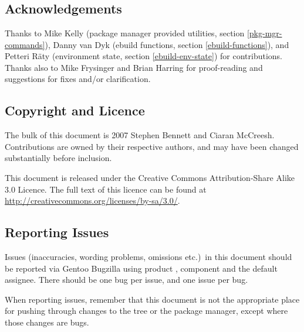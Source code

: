 \chapter*{}

\section*{Acknowledgements}

Thanks to Mike Kelly (package manager provided utilities, section \ref{pkg-mgr-commands}),
Danny van Dyk (ebuild functions, section \ref{ebuild-functions}), and
Petteri R\"aty (environment state, section \ref{ebuild-env-state}) for contributions. Thanks also to
Mike Frysinger and Brian Harring for proof-reading and suggestions for fixes and/or clarification.

\section*{Copyright and Licence}

The bulk of this document is \textcopyright{} 2007 Stephen Bennett and Ciaran McCreesh. Contributions
are owned by their respective authors, and may have been changed substantially before inclusion.

This document is released under the Creative Commons Attribution-Share Alike 3.0 Licence. The full
text of this licence can be found at \url{http://creativecommons.org/licenses/by-sa/3.0/}.

\section*{Reporting Issues}

Issues (inaccuracies, wording problems, omissions etc.)\ in this document should be reported via
Gentoo Bugzilla using product , component  and the default
assignee. There should be one bug per issue, and one issue per bug.

When reporting issues, remember that this document is not the appropriate place for pushing
through changes to the tree or the package manager, except where those changes are bugs.


